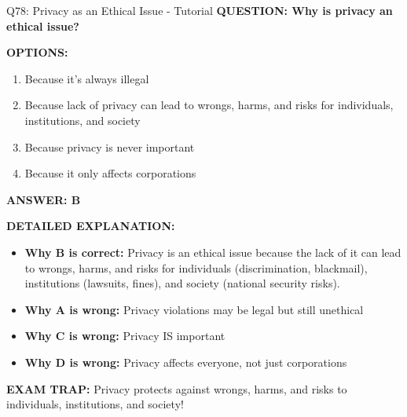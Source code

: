 \documentclass[8pt]{beamer}
\begin{document}
	\begin{frame}{Q78: Privacy as an Ethical Issue - Tutorial}
		\fontsize{6.5}{7.5}\selectfont
		\textbf{QUESTION: Why is privacy an ethical issue?}
		
		\vspace{0.1cm}
		\textbf{OPTIONS:}
		\begin{enumerate}
			\item Because it's always illegal
			\item Because lack of privacy can lead to wrongs, harms, and risks for individuals, institutions, and society
			\item Because privacy is never important
			\item Because it only affects corporations
		\end{enumerate}
		
		\vspace{0.1cm}
		\textcolor{myblue}{\textbf{ANSWER: B}}
		
		\vspace{0.1cm}
		\textbf{DETAILED EXPLANATION:}
		\begin{itemize}
			\item \textbf{Why B is correct:} Privacy is an ethical issue because the lack of it can lead to wrongs, harms, and risks for individuals (discrimination, blackmail), institutions (lawsuits, fines), and society (national security risks).
			\item \textbf{Why A is wrong:} Privacy violations may be legal but still unethical
			\item \textbf{Why C is wrong:} Privacy IS important
			\item \textbf{Why D is wrong:} Privacy affects everyone, not just corporations
		\end{itemize}
		
		\textcolor{myred}{\textbf{EXAM TRAP:}} Privacy protects against \textcolor{myblue}{wrongs, harms, and risks} to individuals, institutions, and society!
	\end{frame}
	
\end{document}
